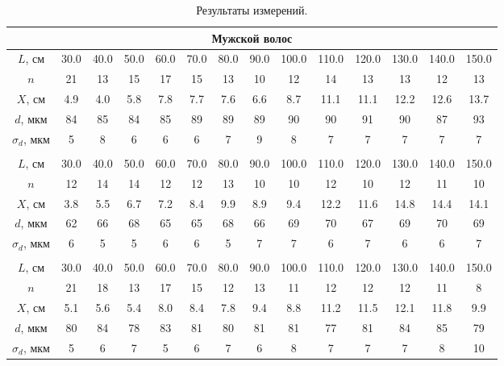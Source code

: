 \documentclass[a4paper,12pt]{article}
\begin{document}
\begin{table}[h]
\begin{tabular}{|c|c|c|c|c|c|c|c|c|c|c|c|c|c|}
\hline
\multicolumn{14}{|c|}{Мужской волос}                                                                             \\ \hline
$L$, см         & 30.0 & 40.0 & 50.0 & 60.0 & 70.0 & 80.0 & 90.0 & 100.0 & 110.0 & 120.0 & 130.0 & 140.0 & 150.0 \\ \hline
$n$             & 21   & 13   & 15   & 17   & 15   & 13   & 10   & 12    & 14    & 13    & 13    & 12    & 13    \\ \hline
$X$, см         & 4.9  & 4.0    & 5.8  & 7.8  & 7.7  & 7.6  & 6.6  & 8.7   & 11.1  & 11.1  & 12.2  & 12.6  & 13.7  \\ \hline
$d$, мкм        & 84   & 85   & 84   & 85   & 89   & 89   & 89   & 90    & 90    & 91    & 90    & 87    & 93    \\ \hline
$\sigma_d$, мкм & 5    & 8    & 6    & 6    & 6    & 7    & 9    & 8     & 7     & 7     & 7     & 7     & 7     \\ \hhline{|==============|}
\multicolumn{14}{|c|}{Женский волос}                                                                             \\ \hline
$L$, см         & 30.0 & 40.0 & 50.0 & 60.0 & 70.0 & 80.0 & 90.0 & 100.0 & 110.0 & 120.0 & 130.0 & 140.0 & 150.0 \\ \hline
$n$                 & 12   & 14   & 14   & 12   & 12   & 13   & 10   & 10    & 12    & 10    & 12    & 11    & 10    \\ \hline
$X$, см         & 3.8  & 5.5  & 6.7  & 7.2  & 8.4  & 9.9  & 8.9  & 9.4   & 12.2  & 11.6  & 14.8  & 14.4  & 14.1  \\ \hline
$d$, мкм        & 62   & 66   & 68   & 65   & 65   & 68   & 66   & 69    & 70    & 67    & 69    & 70    & 69    \\ \hline
$\sigma_d$, мкм & 6    & 5    & 5    & 6    & 6    & 5    & 7    & 7     & 6     & 7     & 6     & 6     & 7     \\ \hhline{|==============|}
\multicolumn{14}{|c|}{Кошачий волос}                                                                             \\ \hline
$L$, см         & 30.0 & 40.0 & 50.0 & 60.0 & 70.0 & 80.0 & 90.0 & 100.0 & 110.0 & 120.0 & 130.0 & 140.0 & 150.0 \\ \hline
$n$                 & 21   & 18   & 13   & 17   & 15   & 12   & 13   & 11    & 12    & 12    & 12    & 11    & 8     \\ \hline
$X$, см         & 5.1  & 5.6  & 5.4  & 8.0    & 8.4  & 7.8  & 9.4  & 8.8   & 11.2  & 11.5  & 12.1  & 11.8  & 9.9   \\ \hline
$d$, мкм        & 80   & 84   & 78   & 83   & 81   & 80   & 81   & 81    & 77    & 81    & 84    & 85    & 79    \\ \hline
$\sigma_d$, мкм & 5    & 6    & 7    & 5    & 6    & 7    & 6    & 8     & 7     & 7     & 7     & 8     & 10    \\ \hline
\end{tabular}
\centering
\caption{Результаты измерений.}
\end{table}\\
\end{document}
